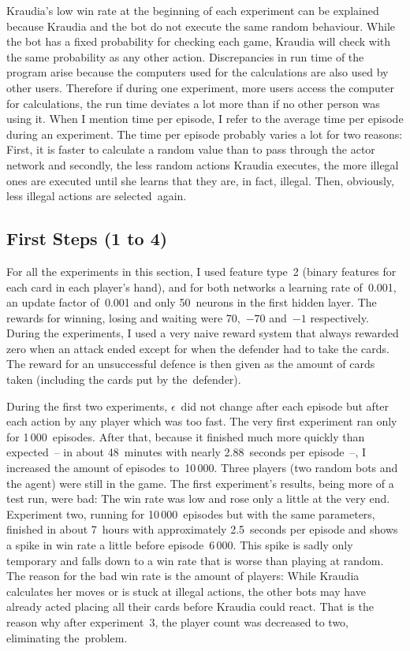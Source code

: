 \documentclass[a4paper,titlepage]{article}
\begin{document}
Kraudia's low win rate at the beginning of each experiment can be explained because Kraudia and the bot do not execute the same random behaviour. While the bot has a fixed probability for checking each game, Kraudia will check with the same probability as any other action. Discrepancies in run time of the program arise because the computers used for the calculations are also used by other users. Therefore if during one experiment, more users access the computer for calculations, the run time deviates a lot more than if no other person was using it. When I mention time per episode, I refer to the average time per episode during an experiment. The time per episode probably varies a lot for two reasons: First, it is faster to calculate a random value than to pass through the actor network and secondly, the less random actions Kraudia executes, the more illegal ones are executed until she learns that they are, in fact, illegal. Then, obviously, less illegal actions are selected~again.

\subsection{First Steps (1 to 4)}

For all the experiments in this section, I used feature type~2 (binary features for each card in each player's hand), and for both networks a learning rate of~0.001, an update factor of~0.001 and only 50~neurons in the first hidden layer. The rewards for winning, losing and waiting were 70,~$-70$ and~$-1$ respectively. During the experiments, I used a very naive reward system that always rewarded zero when an attack ended except for when the defender had to take the cards. The reward for an unsuccessful defence is then given as the amount of cards taken (including the cards put by the~defender).

During the first two experiments, $\epsilon$~did not change after each episode but after each action by any player which was too fast.
The very first experiment ran only for 1\,000~episodes. After that, because it finished much more quickly than expected~-- in about 48~minutes with nearly 2.88~seconds per episode~--, I increased the amount of episodes to~10\,000.
Three players (two random bots and the agent) were still in the game. The first experiment's results, being more of a test run, were bad: The win rate was low and rose only a little at the very end. Experiment two, running for 10\,000~episodes but with the same parameters, finished in about 7~hours with approximately 2.5~seconds per episode and shows a spike in win rate a little before episode~6\,000. This spike is sadly only temporary and falls down to a win rate that is worse than playing at random. The reason for the bad win rate is the amount of players: While Kraudia calculates her moves or is stuck at illegal actions, the other bots may have already acted placing all their cards before Kraudia could react. That is the reason why after experiment~3, the player count was decreased to two, eliminating the~problem. %
\end{document}
